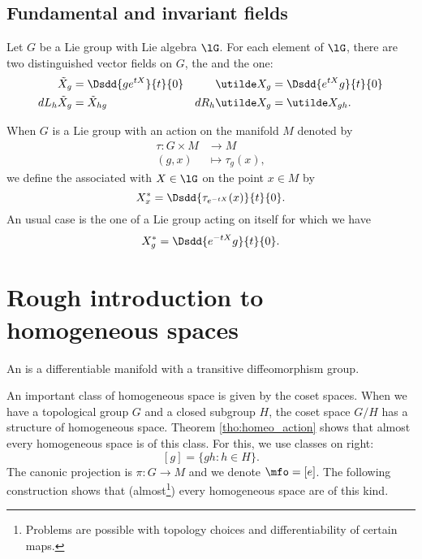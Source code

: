 \subsection{Fundamental and invariant fields}
\label{Subsec_Funda_conv}

Let $G$ be a Lie group with Lie algebra $\lG$. For each element of $\lG$, there are two distinguished vector fields on $G$, the  and the  one:
\begin{align}
\tilde X_g&=\Dsdd{  ge^{tX} }{t}{0}	&\utilde X_g&=\Dsdd{ e^{tX}g }{t}{0}\\
dL_h\tilde X_g&=\tilde X_{hg}		&dR_h\utilde X_g&=\utilde X_{gh}.
\end{align}

When $G$ is a Lie group with an action on the manifold $M$ denoted by
\begin{equation}
\begin{aligned}
 \tau\colon G\times M&\to M \\ 
(g,x)&\mapsto \tau_g(x),
\end{aligned}
\end{equation}
we define the  associated with $X\in\lG$ on the point $x\in M$ by
\begin{equation}			\label{EqDefChmpFonfOff}
X^*_x=\Dsdd{ \tau_{ e^{-tX}}(x) }{t}{0}.
\end{equation}
An usual case is the one of a Lie group acting on itself for which we have
\begin{equation}		\label{EqChmpFondGp}
  X^*_g=\Dsdd{ e^{-tX}g }{t}{0}.
\end{equation}

\section{Rough introduction to homogeneous spaces}
\label{SubSechoappahomsp}\label{SecRoughomo}

An \label{pg:esp_homo} is a differentiable manifold with a transitive diffeomorphism group. 

An important class of homogeneous space is given by the coset spaces. When we have a topological group $G$ and a closed subgroup $H$, the coset space $G/H$ has a structure of homogeneous space. Theorem \ref{tho:homeo_action} shows that almost every homogeneous space is of this class. For this, we use classes on right:
\[
  [g]=\{gh:h\in H\}.
\]
The canonic projection is $\pi\colon G\to M$ and we denote $\mfo=[e]$. The following construction shows that (almost\footnote{Problems are possible with topology choices and differentiability of certain maps.}) every homogeneous space are of this kind.

